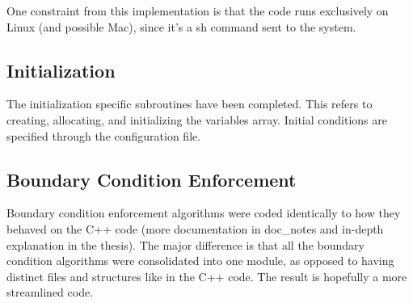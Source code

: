 \documentclass[12pt]{article}
\begin{document}
    One constraint from this implementation is that the code runs exclusively on Linux (and possible Mac), since it's a sh command sent to the system.

    \subsection{Initialization}
    The initialization specific subroutines have been completed. This refers to creating, allocating, and initializing the variables array. Initial conditions are specified through the configuration file.

\subsection{Boundary Condition Enforcement}
    Boundary condition enforcement algorithms were coded identically to how they behaved on the C++ code (more documentation in doc\_notes and in-depth explanation in the thesis). The major difference is that all the boundary condition algorithms were consolidated into one module, as opposed to having distinct files and structures like in the C++ code. The result is hopefully a more streamlined code.
\end{document}

